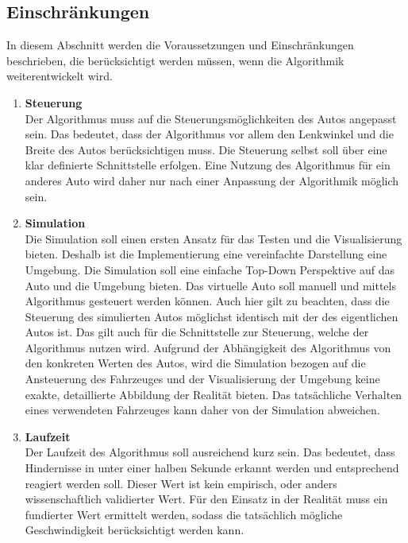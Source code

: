 \subsection{Einschränkungen}
In diesem Abschnitt werden die Voraussetzungen und Einschränkungen be\-schrieben, 
die berücksichtigt werden müssen, wenn die Algorithmik weiterentwickelt wird.

\begin{enumerate}[leftmargin=*]
    \item \textbf{Steuerung} \\
    Der Algorithmus muss auf die Steuerungsmöglichkeiten des Autos ange\-passt sein.
    Das bedeutet, dass der Algorithmus vor allem den Lenkwinkel und die Breite des Autos berücksichtigen muss.
    Die Steuerung selbst soll über eine klar definierte Schnittstelle erfolgen.
    Eine Nutzung des Algorithmus für ein anderes Auto wird daher nur nach einer Anpassung der Algorithmik möglich sein.

    \item \textbf{Simulation} \\
    Die Simulation soll einen ersten Ansatz für das Testen und die Visualisierung bieten. 
    Deshalb ist die Implementierung eine vereinfachte Darstellung eine Umgebung.
    Die Simulation soll eine einfache Top-Down Perspektive auf das Auto und die Umgebung bieten. 
    Das virtuelle Auto soll manuell und mittels Algorithmus gesteuert werden können.
    Auch hier gilt zu beachten, dass die Steuerung des simulierten Autos möglichst identisch mit der des eigentlichen Autos ist.
    Das gilt auch für die Schnittstelle zur Steuerung, welche der Algorithmus nutzen wird.
    Aufgrund der Abhängigkeit des Algorithmus von den konkreten Werten des Autos, 
    wird die Simulation bezogen auf die Ansteuerung des Fahrzeuges und der Visualisierung der Umgebung 
    keine exakte, detaillierte Abbildung der Realität bieten. Das tatsächliche Verhalten eines verwendeten Fahrzeuges 
    kann daher von der Simulation abweichen. 

    \item \textbf{Laufzeit} \\
    Der Laufzeit des Algorithmus soll ausreichend kurz sein.
    Das bedeutet, dass Hindernisse in unter einer halben Sekunde erkannt werden und ent\-sprechend reagiert werden soll.
    Dieser Wert ist kein empirisch, oder anders wissenschaftlich validierter Wert. 
    Für den Einsatz in der Realität muss ein fundierter Wert ermittelt werden, 
    sodass die tatsächlich mögliche Geschwindigkeit berücksichtigt werden kann.
\end{enumerate}

\newpage
